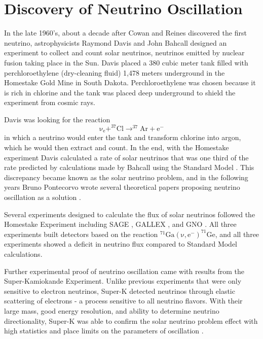 \section{Discovery of Neutrino Oscillation} \label{sec:NeutrinoOsc}

In the late 1960's, about a decade after Cowan and Reines discovered the first neutrino, astrophysicists Raymond Davis and John Bahcall designed an experiment to collect and count solar neutrinos, neutrinos emitted by nuclear fusion taking place in the Sun. 
Davis placed a 380 cubic meter tank filled with perchloroethylene (dry-cleaning fluid) 1,478 meters underground in the Homestake Gold Mine in South Dakota. 
Perchloroethylene was chosen because it is rich in chlorine and the tank was placed deep underground to shield the experiment from cosmic rays. 

Davis was looking for the reaction 
\begin{equation}
	\mathrm{\nu _{e}+ ^{37}Cl \rightarrow  ^{37}Ar+e^{-}} 
	\label{eq:ClAr}
\end{equation}
in which a neutrino would enter the tank and transform chlorine into argon, which he would then extract and count.
In the end, with the Homestake experiment Davis calculated a rate of solar neutrinos that was one third of the rate predicted by calculations made by Bahcall using the Standard Model \cite{Davis}. 
This discrepancy became known as the solar neutrino problem, and in the following years Bruno Pontecorvo wrote several theoretical papers proposing neutrino oscillation as a solution \cite{Pont1968,Pont1977}.

Several experiments designed to calculate the flux of solar neutrinos followed the Homestake Experiment including SAGE \cite{Abdurashitov:1994bc}, GALLEX \cite{Hampel:1998xg}, and GNO \cite{Altmann:2000ft,Bellotti:2001ta}.
All three experiments built detectors based on the reaction $\mathrm{^{71}Ga(\nu,e^{-})^{71}Ge}$, and all three experiments showed a deficit in neutrino flux compared to Standard Model calculations. 

Further experimental proof of neutrino oscillation came with results from the Super-Kamiokande Experiment. Unlike previous experiments that were only sensitive to electron neutrinos, Super-K detected neutrinos through elastic scattering of electrons - a process sensitive to all neutrino flavors.
With their large mass, good energy resolution, and ability to determine neutrino directionality, Super-K was able to confirm the solar neutrino problem effect with high statistics and place limits on the parameters of oscillation \cite{SuperKOsc}.

